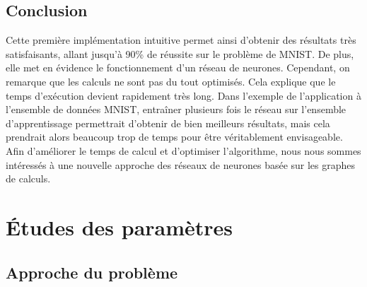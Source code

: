 \documentclass{report}
\theoremstyle{plain}
\theoremstyle{definition}
\theoremstyle{remark}
\begin{document}
\section{Conclusion}
Cette première implémentation intuitive permet ainsi d'obtenir des résultats très satisfaisants, allant jusqu'à 90\% de réussite sur le problème de	 MNIST. De plus, elle met en évidence le fonctionnement d'un réseau de neurones. Cependant, on remarque que les calculs ne sont pas du tout optimisés. Cela explique que le temps d'exécution devient rapidement très long. Dans l'exemple de l'application à l'ensemble de données MNIST, entraîner plusieurs fois le réseau sur l'ensemble d'apprentissage permettrait d'obtenir de bien meilleurs résultats, mais cela prendrait alors beaucoup trop de temps pour être véritablement envisageable.
Afin d'améliorer le temps de calcul et d'optimiser l'algorithme, nous nous sommes intéressés à une nouvelle approche des réseaux de neurones basée sur les graphes de calculs.



\chapter{Études des paramètres}

\section{Approche du problème}
\end{document}
